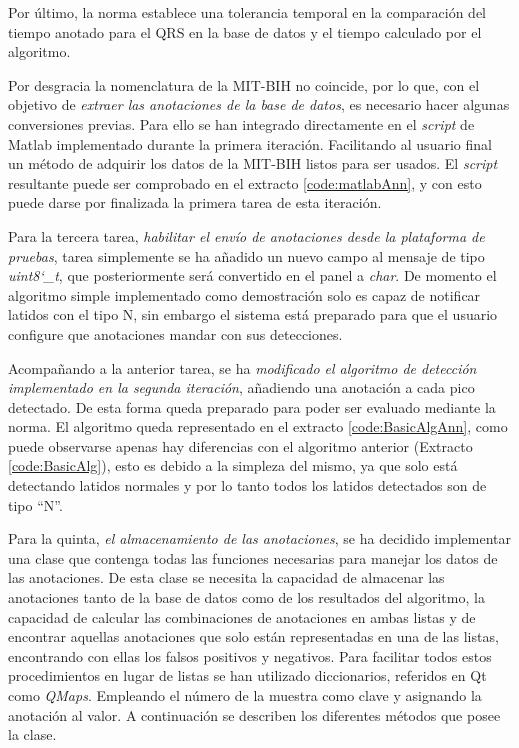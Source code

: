     Por último, la norma establece una tolerancia temporal en la comparación del tiempo anotado para el QRS en la base de datos y el tiempo calculado por el algoritmo. 
        
    Por desgracia la nomenclatura de la MIT-BIH no coincide, por lo que, con el objetivo de \textit{extraer las anotaciones de la base de datos}, es necesario hacer algunas conversiones previas. Para ello se han integrado directamente en el \textit{script} de Matlab implementado durante la primera iteración. Facilitando al usuario final un método de adquirir los datos de la MIT-BIH listos para ser usados. El \textit{script} resultante puede ser comprobado en el extracto \ref{code:matlabAnn}, y con esto puede darse por finalizada la primera tarea de esta iteración.
        
        
    Para la tercera tarea, \textit{habilitar el envío de anotaciones desde la plataforma de pruebas}, tarea simplemente se ha añadido un nuevo campo al mensaje de tipo \textit{uint8\char`_t}, que posteriormente será convertido en el panel a \textit{char}. De momento el algoritmo simple implementado como demostración solo es capaz de notificar latidos con el tipo N, sin embargo el sistema está preparado para que el usuario configure que anotaciones mandar con sus detecciones.
    
    Acompañando a la anterior tarea, se ha \textit{modificado el algoritmo de detección implementado en la segunda iteración}, añadiendo una anotación a cada pico detectado. De esta forma queda preparado para poder ser evaluado mediante la norma. El algoritmo queda representado en el extracto \ref{code:BasicAlgAnn}, como puede observarse apenas hay diferencias con el algoritmo anterior (Extracto \ref{code:BasicAlg}), esto es debido a la simpleza del mismo, ya que solo está detectando latidos normales y por lo tanto todos los latidos detectados son de tipo ``N''.
    
        
    Para la quinta, \textit{el almacenamiento de las anotaciones}, se ha decidido implementar una clase que contenga todas las funciones necesarias para manejar los datos de las anotaciones. De esta clase se necesita la capacidad de almacenar las anotaciones tanto de la base de datos como de los resultados del algoritmo, la capacidad de calcular las combinaciones de anotaciones en ambas listas y de encontrar aquellas anotaciones que solo están representadas en una de las listas, encontrando con ellas los falsos positivos y negativos. Para facilitar todos estos procedimientos en lugar de listas se han utilizado diccionarios, referidos en Qt como \textit{QMaps}. Empleando el número de la muestra como clave y asignando la anotación al valor. A continuación se describen los diferentes métodos que posee la clase.
        

